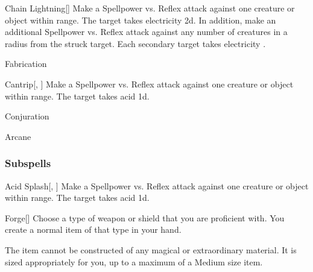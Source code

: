 \begin{ability}[\nth{6}]{Chain Lightning}[]
Make a Spellpower vs. Reflex attack against one creature or object within \rngmed range.
\hit The target takes electricity  \plus2d.
In addition, make an additional Spellpower vs. Reflex attack against any number of creatures in a \areamed radius from the struck target.
\hit Each secondary target takes electricity .
\end{ability}
\vspace{0.25em}

\newpage
\begin{spellsection}{Fabrication}

\begin{spellheader}
\end{spellheader}


\begin{ability}{Cantrip}[, ]
Make a Spellpower vs. Reflex attack against one creature or object within \rngmed range.
\hit The target takes acid  \minus1d.
\end{ability}




 Conjuration

 Arcane
\end{spellsection}


\subsubsection{Subspells}


\begin{ability}[\nth{1}]{Acid Splash}[, ]
Make a Spellpower vs. Reflex attack against one creature or object within \rngmed range.
\hit The target takes acid  \plus1d.
\end{ability}
\vspace{0.25em}


\begin{ability}[\nth{1}]{Forge}[]
Choose a type of weapon or shield that you are proficient with.
You create a normal item of that type in your hand.

The item cannot be constructed of any magical or extraordinary material.
It is sized appropriately for you, up to a maximum of a Medium size item.
\end{ability}
\vspace{0.25em}


